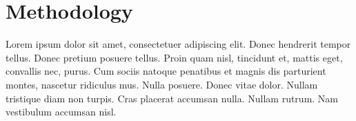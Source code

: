 \documentclass{article}
\begin{document}
\section{Methodology}
Lorem ipsum dolor sit amet, consectetuer adipiscing elit.  Donec hendrerit tempor tellus.  Donec pretium posuere tellus.  Proin quam nisl, tincidunt et, mattis eget, convallis nec, purus.  Cum sociis natoque penatibus et magnis dis parturient montes, nascetur ridiculus mus.  Nulla posuere.  Donec vitae dolor.  Nullam tristique diam non turpis.  Cras placerat accumsan nulla.  Nullam rutrum.  Nam vestibulum accumsan nisl.
\end{document}
